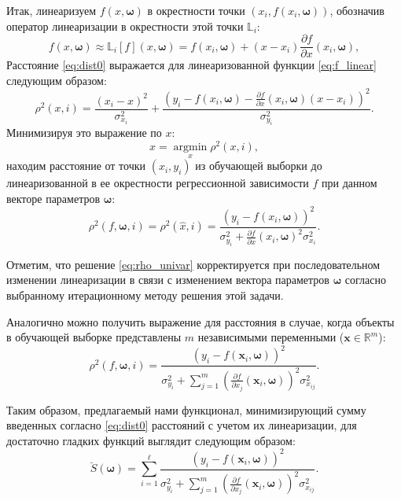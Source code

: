 \documentclass[tikz,10pt,a4paper]{article}
\newcommand{\bomega}{\boldsymbol{\omega}}
\begin{document}
Итак, линеаризуем $f(x, \bomega)$ в окрестности точки $(x_i, f(x_i, \bomega))$,
обозначив оператор линеаризации в окрестности этой точки $\mathbb{L}_i$:
\begin{equation}
  f(x, \bomega) \approx \mathbb{L}_{i}[f](x, \bomega) = f(x_i, \bomega) + (x - x_i) \frac{\partial f}{\partial x}(x_i, \bomega),
  \label{eq:f_linear}
\end{equation}
Расстояние \eqref{eq:dist0} выражается для линеаризованной функции
\eqref{eq:f_linear} следующим образом:
\begin{equation}
  \rho^2(x, i) = \frac{(x_i - x)^2}{\sigma_{x_i}^2} + \frac{(y_i - f(x_i, \bomega) - \frac{\partial f}{\partial x}(x_i, \bomega) (x - x_i))^2}{\sigma_{y_i}^2}.
  \label{eq:dist_linear}
\end{equation}
Минимизируя это выражение по $x$:
\[
  \hat{x} = \mathop{\arg \min}\limits_x \rho^2(x, i),
\]
находим расстояние от точки $(x_i, y_i)$ из обучающей выборки до
линеаризованной в ее окрестности регрессионной зависимости $f$ при
данном векторе параметров $\bomega$:
\begin{equation}
  \rho^2(f, \bomega, i) = \rho^2(\hat{x}, i) = \frac{(y_i - f(x_i, \bomega))^2}{\sigma^2_{y_i} + \frac{\partial f}{\partial x}(x_i, \bomega)^2 \sigma^2_{x_i}}.
  \label{eq:rho_univar}
\end{equation}

Отметим, что решение \eqref{eq:rho_univar} корректируется при
последовательном изменении линеаризации в связи с изменением вектора
параметров $\bomega$ согласно выбранному итерационному методу решения
этой задачи.

Аналогично можно получить выражение для расстояния в случае, когда объекты в обучающей выборке
представлены $m$ независимыми переменными ($\mathbf{x} \in \mathbb{R}^m$):
\[
  \rho^2(f, \bomega, i) = \frac{(y_i - f(\mathbf{x}_i, \bomega))^2}{\sigma_{y_i}^2 + \sum_{j = 1}^m (\frac{\partial f}{\partial x_j}(\mathbf{x}_i, \bomega))^2 \sigma^2_{x_{ij}}}.
\]

Таким образом, предлагаемый нами функционал, минимизирующий сумму введенных
согласно \eqref{eq:dist0} расстояний с учетом их линеаризации,
для достаточно гладких функций выглядит следующим образом:
\begin{equation}
  \breve{S}(\bomega) = \sum_{i = 1}^\ell \frac{(y_i - f(\mathbf{x}_i, \bomega))^2}{\sigma_{y_i}^2 + \sum_{j = 1}^m (\frac{\partial f}{\partial x_j}(\mathbf{x}_i, \bomega))^2 \sigma^2_{x_{ij}}}.
  \label{eq:s}
\end{equation}
\end{document}

